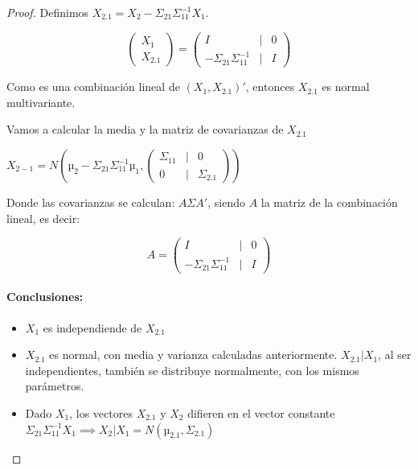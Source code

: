 \documentclass[nochap]{apuntes}
\begin{document}
\begin{proof}
Definimos $X_{2.1} = X_2 - Σ_{21}Σ_{11}^{-1}X_1$.

\[
\begin{pmatrix}
X_1\\
X_{2.1}
\end{pmatrix} =
\begin{pmatrix}
I &| &0\\
\hline
- Σ_{21}Σ_{11}^{-1}  &| &I
 \end{pmatrix}
\]

Como es una combinación lineal de $(X_1,X_{2.1})'$, entonces $X_{2.1}$ es normal multivariante.

Vamos a calcular la media y la matriz de covarianzas de $X_{2.1}$

$X_{2-1} = N\left( µ_2-Σ_{21}Σ_{11}^{-1}µ_1 , \begin{pmatrix} Σ_{11} &|&0\\\hline 0&|&Σ_{2.1} \end{pmatrix} \right)$

Donde las covarianzas se calculan: $AΣA'$, siendo $A$ la matriz de la combinación lineal, es decir:

\[
A=\begin{pmatrix}
I &| &0\\
\hline
- Σ_{21}Σ_{11}^{-1}  &| &I
 \end{pmatrix}
\]



\paragraph{Conclusiones:}

\begin{itemize}
	\item $X_1$ es independiende de $X_{2.1}$
	\item $X_{2.1}$ es normal, con media y varianza calculadas anteriormente.
	\subitem $X_{2.1}|X_1$, al ser independientes, también se distribuye normalmente, con los mismos parámetros.
	\item Dado $X_1$, los vectores $X_{2.1}$ y $X_2$  difieren en el vector constante $Σ_{21}Σ_{11}^{-1}X_1 \implies X_2|X_1 = N\left( µ_{2.1}, Σ_{2.1} \right)$
\end{itemize}

\end{proof}
\end{document}
